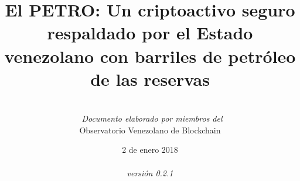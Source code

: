 \documentclass[spanish,letterpaper,11pt]{article}
\title{\bf El  PETRO: Un criptoactivo seguro respaldado por el
Estado venezolano con barriles de petróleo de las reservas}
\author{%
     \\~\emph{Documento elaborado por miembros del} \\Observatorio Venezolano de Blockchain \\%
}
\date{2 de enero 2018 \\~\\{%
\emph{versión 0.2.1}%
}
}
\begin{document}

\maketitle

\begin{abstract}



\end{abstract}

\setlength{\columnsep}{20pt}

\tableofcontents












\renewcommand{\appendixname}{Anexos}

\begin{appendices} %




%

\end{appendices}
\end{document}
